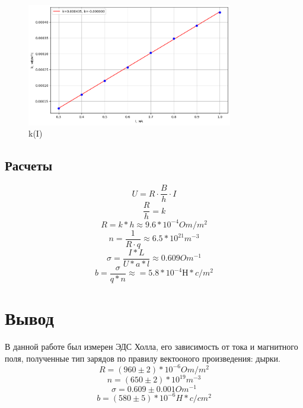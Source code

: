 \documentclass[a4paper, 12pt]{article}
\begin{document}
    \begin{figure}[h!]
        \centering
        \includegraphics[width=90mm]{./images/k-I.png}
        \caption{k(I)}
    \end{figure}

\newpage
\subsection{Расчеты}
\[U = R \cdot \frac{B}{h} \cdot I\]
\[\frac{R}{h} = k\]
\[R = k*h \approx 9.6*10^{-4} Om/m^2\]
\[n = \frac{1}{R \cdot q } \approx 6.5 * 10^{21} m^{-3}\]
\[\sigma = \frac{I*L}{U*a*l} \approx 0.609 Om^{-1}\]
\[b = \frac{\sigma}{q*n} \approx = 5.8 * 10^{-4}Н*c/m^2\]


\section{Вывод}
В данной работе был измерен ЭДС Холла, его зависимость от тока и магнитного поля, 
полученные тип зарядов по правилу вектооного произведения: дырки.
\[R = (960 \pm 2)*10^{-6} Om/m^2\]
\[n = (650 \pm 2)*10^{19} m^{-3}\]
\[\sigma = 0.609 \pm 0.001 Om^{-1}\]
\[b = (580 \pm 5)*10^{-6} H*c/cm^2\]
\end{document}
